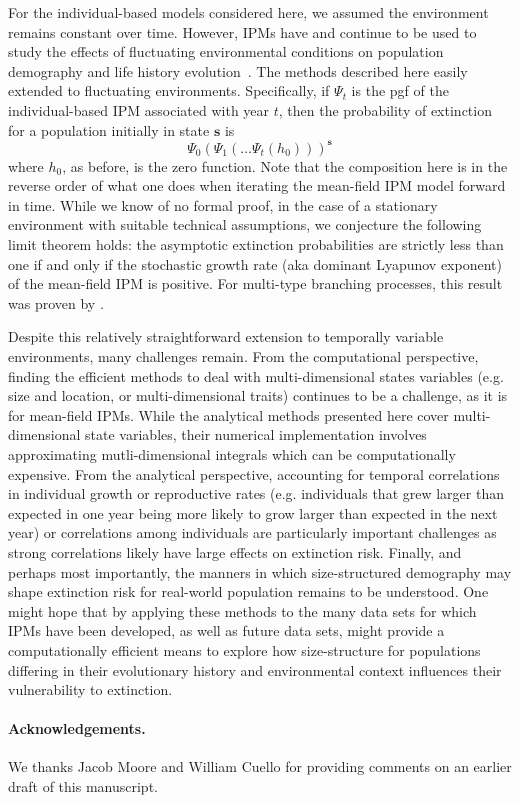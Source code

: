 \documentclass[12pt]{amsart}\usepackage[]{graphicx}\usepackage[]{color}
\def\s{\mathbf s}
\begin{document}
For the individual-based models considered here, we assumed the environment remains constant over time. However, IPMs have and continue to be used to study the effects of fluctuating environmental conditions on population demography and life history evolution~\citep{childs-etal-04,dahlgren-ehrlen-11,rees-ellner-09}. The methods described here easily extended to fluctuating environments. Specifically, if $\Psi_t$ is the pgf of the individual-based IPM associated with year $t$, then the probability of extinction for a population initially in state $\s$ is
\[
\Psi_0(\Psi_1(\dots \Psi_t(h_0)))^\s
\]
where $h_0$, as before, is the zero function. Note that the composition here is in the reverse order of what one does when iterating the mean-field IPM model forward in time. While we know of no formal proof, in the case of a stationary environment with suitable technical assumptions, we conjecture the following limit theorem holds: the asymptotic extinction probabilities are strictly less than one if and only if the stochastic growth rate (aka dominant Lyapunov exponent) of the mean-field IPM is positive. For multi-type branching processes, this result was proven by \citet{tanny-81}.

Despite this relatively straightforward extension to temporally variable environments, many challenges remain. From the computational perspective, finding the efficient methods to deal with multi-dimensional states variables (e.g. size and location, or multi-dimensional traits) continues to be a challenge, as it is for mean-field IPMs. While the analytical methods presented here cover multi-dimensional state variables, their numerical implementation involves approximating mutli-dimensional integrals which can be computationally expensive. From the analytical perspective, accounting for temporal correlations in individual growth or reproductive rates (e.g. individuals that grew larger than expected in one year being more likely to grow larger than expected in the next year) or correlations among individuals are particularly important challenges as strong correlations likely have large effects on extinction risk.
Finally, and perhaps most importantly, the  manners in which size-structured demography may shape extinction risk for real-world population remains to be understood. One might hope that by applying these methods to the many data sets for which IPMs have been developed, as well as future data sets, might provide a computationally efficient means to explore how size-structure for populations differing in their evolutionary history and environmental context influences their vulnerability to extinction.

\vskip 0.1in
\paragraph{\bf Acknowledgements.} We thanks Jacob Moore and William Cuello for providing comments on an earlier draft of this manuscript.

\end{document}
